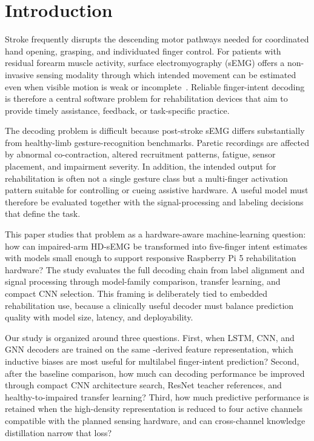 \section{Introduction}

Stroke frequently disrupts the descending motor pathways needed for coordinated hand opening, grasping, and individuated finger control. For patients with residual forearm muscle activity, surface electromyography (sEMG) offers a non-invasive sensing modality through which intended movement can be estimated even when visible motion is weak or incomplete~\citep{munoznovoa2022upper,zheng2021semg,boukhennoufa2022wearable}. Reliable finger-intent decoding is therefore a central software problem for rehabilitation devices that aim to provide timely assistance, feedback, or task-specific practice.

The decoding problem is difficult because post-stroke sEMG differs substantially from healthy-limb gesture-recognition benchmarks. Paretic recordings are affected by abnormal co-contraction, altered recruitment patterns, fatigue, sensor placement, and impairment severity. In addition, the intended output for rehabilitation is often not a single gesture class but a multi-finger activation pattern suitable for controlling or cueing assistive hardware. A useful model must therefore be evaluated together with the signal-processing and labeling decisions that define the task.

This paper studies that problem as a hardware-aware machine-learning question: how can impaired-arm HD-sEMG be transformed into five-finger intent estimates with models small enough to support responsive Raspberry Pi 5 rehabilitation hardware? The study evaluates the full decoding chain from label alignment and signal processing through model-family comparison, transfer learning, and compact CNN selection. This framing is deliberately tied to embedded rehabilitation use, because a clinically useful decoder must balance prediction quality with model size, latency, and deployability.

Our study is organized around three questions. First, when LSTM, CNN, and GNN decoders are trained on the same \physiomio-derived feature representation, which inductive biases are most useful for multilabel finger-intent prediction? Second, after the baseline comparison, how much can decoding performance be improved through compact CNN architecture search, ResNet teacher references, and healthy-to-impaired transfer learning? Third, how much predictive performance is retained when the high-density representation is reduced to four active channels compatible with the planned sensing hardware, and can cross-channel knowledge distillation narrow that loss?

